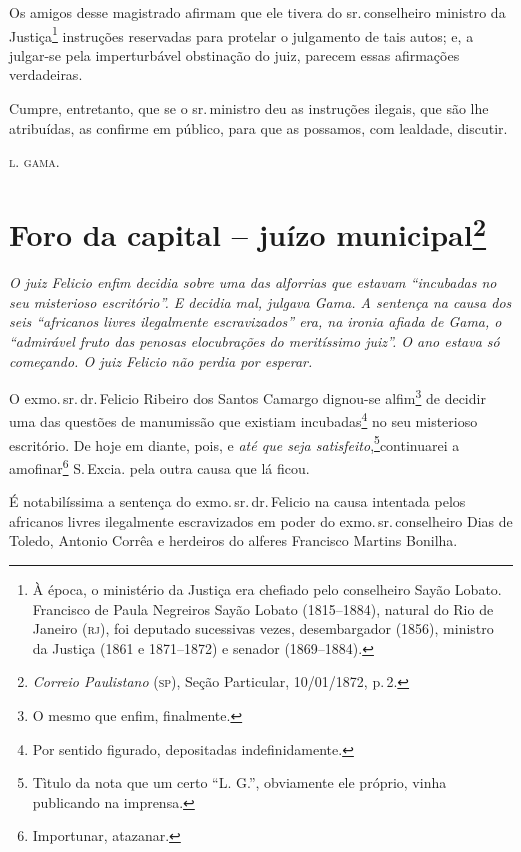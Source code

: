 Os amigos desse magistrado afirmam que ele tivera do sr.\,conselheiro
ministro da Justiça\footnote{ À época, o ministério da Justiça era
  chefiado pelo conselheiro Sayão Lobato. Francisco de Paula Negreiros
  Sayão Lobato (1815--1884), natural do Rio de Janeiro (\textsc{rj}), foi deputado
  sucessivas vezes, desembargador (1856), ministro da Justiça (1861 e
  1871--1872) e senador (1869--1884).} instruções reservadas para protelar
o julgamento de tais autos; e, a julgar-se pela imperturbável obstinação
do juiz, parecem essas afirmações verdadeiras.

Cumpre, entretanto, que se o sr.\,ministro deu as instruções ilegais, que
são lhe atribuídas, as confirme em público, para que as possamos, com
lealdade, discutir.

\textsc{l. gama}.

\chapter{Foro da capital -- juízo municipal\footnote{\emph{Correio Paulistano} (\textsc{sp}), Seção Particular,
  10/01/1872, p.\,2.}} %

\begin{didascalia}
\emph{O juiz Felicio enfim decidia sobre uma das alforrias que estavam
``incubadas no seu misterioso escritório''. E decidia mal, julgava Gama. A
sentença na causa dos seis ``africanos livres ilegalmente escravizados''
era, na ironia afiada de Gama, o ``admirável fruto das penosas
elocubrações do meritíssimo juiz''. O ano estava só começando. O juiz
Felicio não perdia por esperar.}
\end{didascalia}

O exmo.\,sr.\,dr.\,Felicio Ribeiro dos Santos Camargo dignou-se
alfim\footnote{ O mesmo que enfim, finalmente.} de decidir uma das
questões de manumissão que existiam incubadas\footnote{ Por sentido
  figurado, depositadas indefinidamente.} no seu misterioso escritório.
De hoje em diante, pois, e \emph{até que seja satisfeito},\footnote{ Tìtulo da nota que um certo ``L. G.'', obviamente ele próprio,
  vinha publicando na imprensa.}continuarei a amofinar\footnote{
  Importunar, atazanar.} S.\,Excia. pela outra causa que lá ficou.

É notabilíssima a sentença do exmo.\,sr.\,dr.\,Felicio na causa intentada
pelos africanos livres ilegalmente escravizados em poder do exmo.\,sr.\,conselheiro Dias de Toledo, Antonio Corrêa e herdeiros do alferes
Francisco Martins Bonilha.

